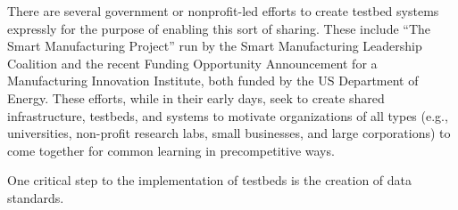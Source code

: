 There are several government or nonprofit-led efforts to create testbed systems expressly for the purpose of enabling this sort of sharing. These include ``The Smart Manufacturing Project'' run by the Smart Manufacturing Leadership Coalition and the recent Funding Opportunity Announcement for a Manufacturing Innovation Institute, both funded by the US Department of Energy\cite{SmartManufacturingLeadershipCoalition2013,EERE-MII}. These efforts, while in their early days, seek to create shared infrastructure, testbeds, and systems to motivate organizations of all types (e.g., universities, non-profit research labs, small businesses, and large corporations) to come together for common learning in precompetitive ways. 

One critical step to the implementation of testbeds is the creation of data standards. 

